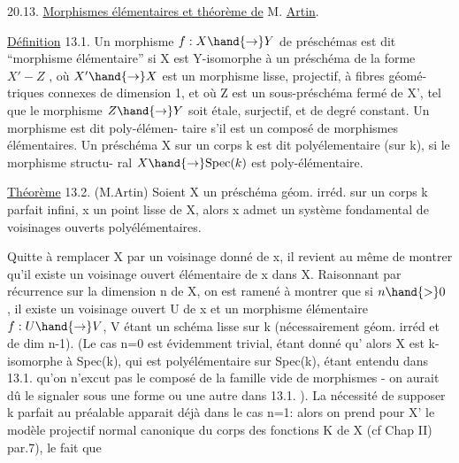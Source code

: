 
20.13. \uline{Morphismes élémentaires et théorème de} M. \uline{Artin}.

\uline{Définition} 13.1. Un morphisme $f:X\hand{\to} Y$ de préschémas est dit ``morphisme
 élémentaire'' si X est  Y-isomorphe à un préschéma de la forme
$X' - Z$ , où $X'\hand{\to} X$ est un morphisme lisse, projectif, à fibres géomé-%
triques connexes de dimension 1, et où Z est un sous-préschéma fermé
de X',  tel que le morphisme $Z\hand{\to} Y$ soit étale, surjectif, et
de degré constant. Un morphisme est dit  poly-élémen-%
taire s'il est un composé de morphismes élémentaires. Un préschéma X
sur un corps k est dit polyélementaire (sur k), si le morphisme structu-%
ral $X\hand{\to} \mathrm{Spec}(k)$ est poly-élémentaire.

\uline{Théorème} 13.2. (M.Artin) Soient X un préschéma géom. irréd. sur un corps k parfait infini, x un point lisse
de X, alors x admet un système fondamental de voisinages ouverts
polyélémentaires.

Quitte à remplacer X par un voisinage donné de x,  il revient au
 même de montrer qu'il existe un voisinage ouvert élémentaire de x dans X.
  Raisonnant par récurrence sur
la dimension n de X, on  est ramené à montrer que si $n\hand{>}0$ , il existe
un voisinage ouvert U de x et un morphisme élémentaire $f: U\hand{\to} V$,
V étant un schéma lisse sur k (nécessairement géom. irréd et de dim n-1).
 (Le cas n=0 est évidemment trivial, étant donné qu' alors
X est k-isomorphe à Spec(k), qui est polyélémentaire sur Spec(k), étant
entendu dans 13.1. qu'on n'excut pas le composé de la famille vide de
morphismes - on aurait dû le signaler sous une forme ou une autre dans
13.1. ). La nécessité de supposer k parfait au préalable apparait déjà
dans le cas n=1: alors on prend pour X' le modèle projectif normal
canonique du corps des fonctions K de X (cf Chap II) par.7), le fait que

